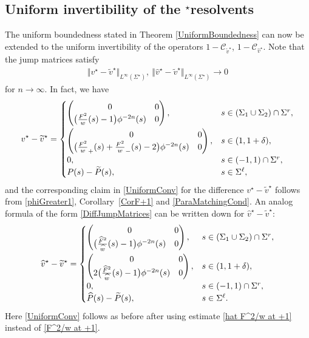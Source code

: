 \documentclass[11pt]{article}
\numberwithin{equation}{section}
\newcommand{\hw}{\widehat w}
\newcommand{\bP}{P}
\newcommand{\hP}{{\widehat P}}
\newcommand{\tP}{{\widetilde P}}
\newcommand{\hv}{{\widehat v}}
\newcommand{\sbv}{v^\star}
\newcommand{\shv}{{\widehat v^\star}}
\newcommand{\stv}{{\widetilde v^\star}}
\newcommand{\hF}{\widehat F}
\newcommand{\Fw}{\frac{F^2}{w}}
\newcommand{\hFw}{\frac{\hF^2}{\hw}}
\newcommand{\sCauhv}{\mathcal C_{\hv^\star}}
\newcommand{\sCautv}{\mathcal C_{\stv}}
\numberwithin{equation}{section}
\begin{document}
\subsection[Uniform invertibility of the star resolvents]{Uniform invertibility of the $\boldsymbol{{}^\star}$resolvents}\label{Comparison}
The uniform boundedness stated in Theorem \ref{UniformBoundedness} can now be extended to the uniform invertibility of the operators $1-\sCautv$, $1-\sCauhv$. Note that the jump matrices satisfy
\begin{align}\label{UniformConv}
\Vert \sbv - \stv \Vert_{L^\infty(\Sigma^\star)}, \ \Vert \shv - \stv \Vert_{L^\infty(\Sigma^\star)} \to 0
\end{align}
for $n \to \infty$. In fact, we have
\begin{align}
 \sbv - \stv =
 \begin{cases}
 \begin{pmatrix}
 0 & 0
 \\
 \big(\Fw(s)-1\big)\phi^{-2n}(s) & 0
 \end{pmatrix}, & s\in (\Sigma_1 \cup \Sigma_2)\cap\Sigma^r,\vspace{1mm}
 \\
 \begin{pmatrix}
 0 & 0
 \\
 \big(\Fw_+(s) +\Fw_-(s)-2\big)\phi^{-2n}(s) & 0
 \end{pmatrix}, & s\in (1,1+\delta),
 \\
 0, & s\in(-1,1)\cap \Sigma^r,
 \\
 \bP(s)-\tP(s), & s\in\Sigma^\ell,
 \end{cases}\label{DiffJumpMatrices}
\end{align}
and the corresponding claim in \eqref{UniformConv} for the difference $\sbv - \stv$ follows from \eqref{phiGreater1}, Corollary~\ref{CorF+1} and \eqref{ParaMatchingCond}. An analog formula of the form \eqref{DiffJumpMatrices} can be written down for $\shv - \stv$:
\begin{align*}
 \shv - \stv =
 \begin{cases}
 \begin{pmatrix}
 0 & 0
 \\
 \big(\hFw(s)-1\big)\phi^{-2n}(s) & 0
 \end{pmatrix}, & s\in (\Sigma_1 \cup \Sigma_2)\cap\Sigma^r,\vspace{1mm}
 \\
 \begin{pmatrix}
 0 & 0
 \\
 2\big(\hFw(s)-1\big)\phi^{-2n}(s) & 0
 \end{pmatrix}, & s\in (1,1+\delta),
 \\
 0, & s\in(-1,1)\cap \Sigma^r,
 \\
 \hP(s)-\tP(s), & s\in\Sigma^\ell.
 \end{cases}
\end{align*}
Here \eqref{UniformConv} follows as before after using estimate \eqref{hat F^2/w at +1} instead of \eqref{F^2/w at +1}.
\end{document}

